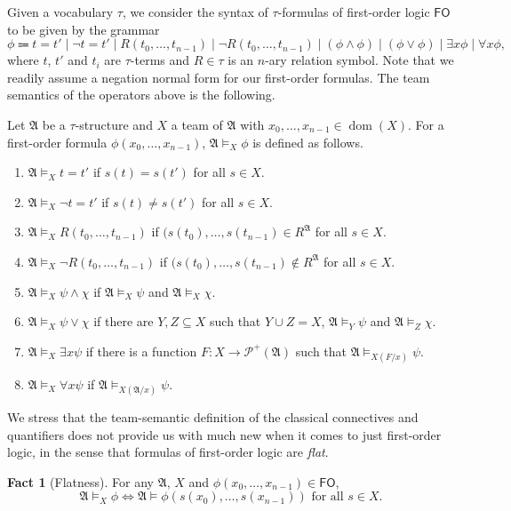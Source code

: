 \documentclass[a4paper]{amsart}
\theoremstyle{definition}
\newtheorem*{fact}{Fact}
\theoremstyle{remark}
\newcommand{\A}{\mathcal{A}}
\DeclareMathOperator{\Pow}{\wp}
\DeclareMathOperator{\dom}{dom}
\newcommand\fol{\mathsf{FO}}
\theoremstyle{definition}
\renewcommand{\A}{\mathfrak{A}}
\renewcommand{\Pow}{\mathcal{P}}
\begin{document}
Given a vocabulary $\tau$, we consider the syntax of $\tau$-formulas of first-order logic $\fol$ to be given by the grammar
\[
	\phi \Coloneqq t=t'  \mid \neg t=t' \mid R(t_0,\dots,t_{n-1}) \mid \neg R(t_0,\dots,t_{n-1}) \mid  (\phi \land \phi) \mid (\phi\lor\phi)  \mid \exists x \phi \mid \forall x \phi,	
\]
where $t$, $t'$ and $t_i$ are $\tau$-terms and $R\in\tau$ is an $n$-ary relation symbol. Note that we readily assume a negation normal form for our first-order formulas. The team semantics of the operators above is the following.

Let $\A$ be a $\tau$-structure and $X$ a team of $\A$ with $x_0,\dots,x_{n-1}\in \dom(X)$. For a first-order formula $\phi(x_0,\dots,x_{n-1})$, $\A\models_X\phi$ is defined as follows.
\begin{enumerate}
    \item $\A\models_X t=t'$ if $s(t)=s(t')$ for all $s\in X$.
    \item $\A\models_X \neg t=t'$ if $s(t)\neq s(t')$ for all $s\in X$.
    \item $\A\models_X R(t_0,\dots,t_{n-1})$ if $(s(t_0),\dots,s(t_{n-1})\in R^{\A}$ for all $s\in X$.
    \item $\A\models_X \neg R(t_0,\dots,t_{n-1})$ if $(s(t_0),\dots,s(t_{n-1})\notin R^{\A}$ for all $s\in X$.
    \item $\A\models_X \psi \land \chi$ if $\A\models_X \psi$ and $\A\models_X \chi$.
    \item $\A\models_X \psi \vee \chi$ if there are $Y,Z\subseteq X$ such that $ Y\cup Z = X$,  $\A\models_Y \psi$ and $\A\models_Z \chi$.
    \item $\A\models_X \exists x \psi$ if there is a function $F\colon X\to \Pow^+(\A)$ such that $ \A\models_{X(F/x)} \psi$.
    \item $\A\models_X\forall x \psi $ if $\A\models_{X(\A/x)} \psi$. 
\end{enumerate}

We stress that the team-semantic definition of the classical connectives and quantifiers does not provide us with much new when it comes to just first-order logic, in the sense that formulas of first-order logic are \emph{flat}.

\begin{fact}[Flatness]
    For any $\A$, $X$ and $\phi(x_0,\dots,x_{n-1})\in\fol$,
    \[
        \A\models_X\phi \iff \text{$\A\models\phi(s(x_0),\dots,s(x_{n-1}))$ for all $s\in X$}.
    \]
\end{fact}
\end{document}
